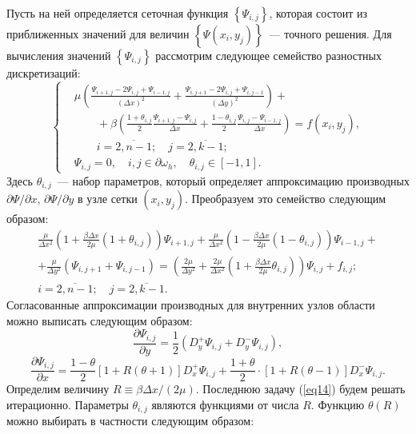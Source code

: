 \documentclass[press]{vestnik}
\begin{document}
Пусть на ней определяется сеточная функция $\left\{ {\Psi_{i,j} } 
\right\}$, которая состоит из приближенных значений для величин $\left\{ 
{\Psi \left( {x_{i} ,y_{j} } \right)} \right\}$~--- точного решения. Для 
вычисления значений $\left\{ {\Psi_{i,j} } \right\}$ рассмотрим следующее 
семейство разностных дискретизаций:
\[
\left\{ \begin{aligned}
&\mu \left( \frac{\Psi_{i+1,j} -2\Psi_{i,j} +\Psi_{i-1,j} }{(\Delta x)^{2}}+\frac{\Psi_{i,j+1} -2\Psi_{i,j} +\Psi_{i,j-1} }{(\Delta y)^{2}} \right)+\\
&\qquad+\beta \left( \frac{1+\theta_{i,j} }{2} \frac{\Psi_{i+1,j} -\Psi_{i,j} }{\Delta x} +\frac{1-\theta_{i,j} }{2} \frac{\Psi_{i,j} -\Psi_{i-1,j} }{\Delta x}\right)=f(x_{i} ,y_{j} ),\\
&\qquad i=\overline {2,n-1} ;\quad j=\overline 
{2,k-1} ; \\ 
&\Psi_{i,j} =0,\quad i,j\in \partial \omega_{h} ,\quad \theta_{i,j} \in 
\left[ {-1,1} \right].
 \end{aligned} \right.
\]
Здесь $\theta_{i,j} $~--- набор параметров, который определяет аппроксимацию 
производных $\partial \Psi / \partial x$, $\partial \Psi/\partial y$ в узле сетки $\left( {x_{i} ,y_{j} } \right)$. Преобразуем 
это семейство следующим образом:
\begin{multline}
\label{eq14}
 \frac{\mu }{\Delta x^{2}} \left( {1+\frac{\beta \Delta x}{2\mu 
}(1+\theta_{i,j} )} \right) \Psi_{i+1,j} +\frac{\mu }{\Delta 
x^{2}} \left( {1-\frac{\beta \Delta x}{2\mu }(1-\theta_{i,j} )} 
\right) \Psi_{i-1,j} +\\
+ \frac{\mu }{\Delta y^{2}}\left( {\Psi_{i,j+1} +\Psi_{i,j-1} } \right)= \left( {\frac{2\mu }{\Delta y^{2}}+\frac{2\mu }{\Delta x^{2}}\left( 
{1+\frac{\beta \Delta x}{2\mu }\theta_{i,j} } \right)} \right) \Psi 
_{i,j} +f_{i,j} ;\\
 i=\overline {2,n-1} ;\quad j=\overline {2,k-1}.
\end{multline}
Согласованные аппроксимации производных для внутренних узлов области можно 
выписать следующим образом:
\begin{equation}
\label{eq15}
\frac{\partial \Psi_{i,j} }{\partial y}=\frac{1}{2}\left( {D_{y}^{+} \Psi 
_{i,j} +D_{y}^{-} \Psi_{i,j} } \right),
\end{equation}
\[
\frac{\partial \Psi_{i,j} }{\partial x}=\frac{1-\theta }{2} \left[ 
{1+R\left( {\theta +1} \right)} \right] D_{x}^{+} \Psi_{i,j} 
+\frac{1+\theta }{2}\cdot \left[ {1+R\left( {\theta -1} \right)} 
\right] D_{x}^{-} \Psi_{i,j} .
\]
Определим величину $R\equiv \beta \Delta x/(2\mu)$. Последнюю задачу 
(\ref{eq14}) будем решать итерационно. Параметры $\theta_{i,j} $ являются функциями 
от числа $R$. Функцию $\theta \left( R \right)$ можно выбирать в частности 
следующим образом:
\end{document}
